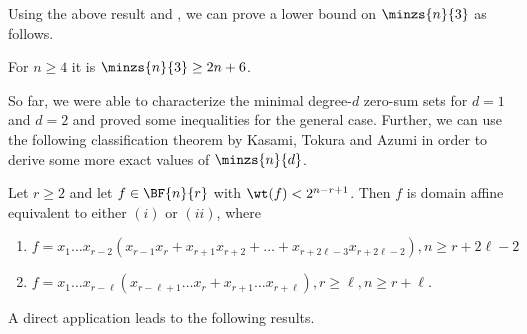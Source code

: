 Using the above result and , we can prove a lower bound on $\minzs{n}{3}$ as follows.
\begin{corollary}
For $n \geq 4$ it is $\minzs{n}{3} \geq 2n+6$.
\end{corollary}

So far, we were able to characterize the minimal degree-$d$ zero-sum sets for $d=1$ and $d=2$ and proved some inequalities for the general case. Further, we can use the following classification theorem by Kasami, Tokura and Azumi in order to derive some more exact values of $\minzs{n}{d}$. 


\begin{theorem}
Let $r\geq 2$ and let $f \in \BF{n}{r}$ with $\wt(f) < 2^{n-r+1}$. Then $f$ is domain affine equivalent to either $(i)$ or $(ii)$, where
\enumroman
\begin{enumerate}
\item $f = x_1 \ldots x_{r-2}(x_{r-1} x_{r} + x_{r+1} x_{r+2} + \ldots + x_{r+2\ell-3}x_{r+2\ell-2}), n \geq r+2\ell -2$
\vspace{.5em}
\item $f = x_1 \ldots x_{r-\ell}(x_{r-\ell+1}\ldots x_{r} + x_{r+1} \ldots x_{r+\ell}), r \geq \ell, n \geq r + \ell$\;.
\end{enumerate}
\end{theorem}


A direct application leads to the following results.

